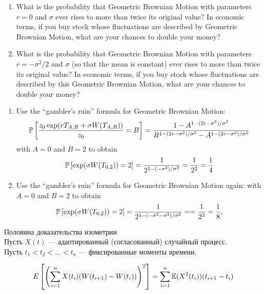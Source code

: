\begin{problem}
  \begin{enumerate}
    \item What is the probability that Geometric Brownian
    Motion with parameters $r = 0$ and $\sigma$ ever rises to more than
    twice its original value? In economic terms, if you buy
    stock whose fluctuations are described by Geometric
    Brownian Motion, what are your chances to double your
    money?

    \item What is the probability that Geometric Brownian
    Motion with parameters $r = -\sigma^2/2$ and $\sigma$ (so
    that the mean is constant) ever rises to more than twice
    its original value?  In economic terms, if you buy stock
    whose fluctuations are described by this Geometric Brownian
    Motion, what are your chances to double your money?
  \end{enumerate}

\begin{sol}

\begin{enumerate}
  \item Use the ``gambler's ruin'' formula for Geometric
  Brownian Motion:
  \[
     \P\left[
          \frac{ z_0 \exp( r T_{A,B}
                       + \sigma W(T_{A,B}))}{z_0} = B
          \right] =
          \frac{1 - A^{1 - (2r-\sigma^2)/\sigma^2}}
               {B^{1 - (2r-\sigma^2)/\sigma^2}
               - A^{1 - (2r-\sigma^2)/\sigma^2}}
  \]
  with $A = 0$ and $B = 2$ to obtain
  \[
     \P\left[
          \exp(\sigma W(T_{0,2})) = 2
          \right] =
          \frac{1}
               {2^{1 - (-\sigma^2)/\sigma^2}} =
              \frac{1}{2^2} = \frac{1}{4}
  \]

  \item Use the ``gambler's ruin'' formula for Geometric
  Brownian Motion again:
  with $A = 0$ and $B = 2$ to obtain
  \[
     \P\left[
          \exp(\sigma W(T_{0,2})) = 2
          \right] =
          \frac{1}
               {2^{1 - (-\sigma^2-\sigma^2)/\sigma^2}} =
            = \frac{1}{2^3} = \frac{1}{8},
  \]

\end{enumerate}
\end{sol}
\end{problem}

\begin{problem}
 Половина доказательства изометрии \\
Пусть $X(t)$ — адаптированный (согласованный) случайный процесс. \\
Пусть $t_{1}<t_{2}<\ldots<t_{n}$ — фиксированные моменты времени. \\


\begin{sol}
\[
E\left[\left(\sum_{i=1}^{n}X(t_{i})(W(t_{i+1})-W(t_{i}))\right)^{2}\right]=
  \sum_{i=1}^{n}\E(X^{2}(t_{i}))(t_{i+1}-t_{i})
\]
\end{sol}
\end{problem}

